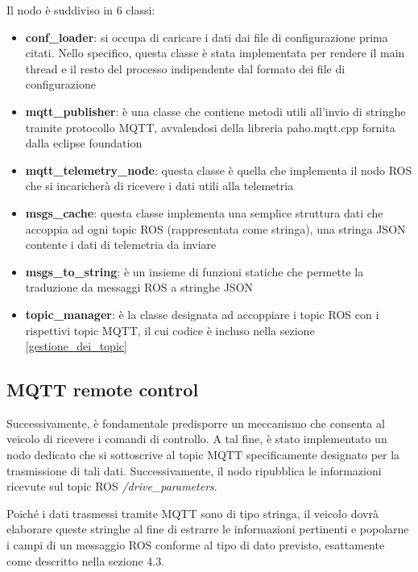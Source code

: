

\noindent Il nodo è suddiviso in 6 classi:

\begin{itemize}
  \item \textbf{conf\_loader}: si occupa di caricare i dati dai file di configurazione prima citati. Nello specifico, questa classe è stata implementata per rendere il main thread e il resto del processo indipendente dal formato dei file di configurazione
  \item \textbf{mqtt\_publisher}: è una classe che contiene metodi utili all'invio di stringhe tramite protocollo MQTT, avvalendosi della libreria paho.mqtt.cpp fornita dalla eclipse foundation 
  \item \textbf{mqtt\_telemetry\_node}: questa classe è quella che implementa il nodo ROS che si incaricherà di ricevere i dati utili alla telemetria
  \item \textbf{msgs\_cache}: questa classe implementa una semplice struttura dati che accoppia ad ogni topic ROS (rappresentata come stringa), una stringa JSON contente i dati di telemetria da inviare
  \item \textbf{msgs\_to\_string}: è un insieme di funzioni statiche che permette la traduzione da messaggi ROS a stringhe JSON
  \item \textbf{topic\_manager}: è la classe designata ad accoppiare i topic ROS con i rispettivi topic MQTT, il cui codice è incluso nella sezione \ref{gestione_dei_topic} 
\end{itemize}

\subsection{MQTT remote control} \label{mqtt_remote_control}
Successivamente, è fondamentale predisporre un meccanismo che consenta al veicolo di ricevere i comandi di controllo. A tal fine, è stato implementato un nodo dedicato che si sottoscrive al topic MQTT specificamente designato per la trasmissione di tali dati. Successivamente, il nodo ripubblica le informazioni ricevute sul topic ROS \textit{/drive\_parameters}.

\noindent Poiché i dati trasmessi tramite MQTT sono di tipo stringa, il veicolo dovrà elaborare queste stringhe al fine di estrarre le informazioni pertinenti e popolarne i campi di un messaggio ROS conforme al tipo di dato previsto, esattamente come descritto nella sezione 4.3.

